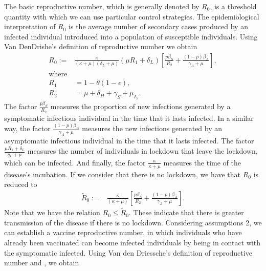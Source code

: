 
%
The basic reproductive number, which is generally denoted by $ R_0 $,
is a threshold quantity with which we can use 
particular control strategies. The epidemiological interpretation of 
$ R_0 $ is the average number of secondary cases produced by an infected
individual introduced into a population of susceptible individuals.
Using Van DenDrishe's \cite{VandenDriessche2017a} definition of reproductive number
we obtain
\begin{equation*}
    \label{eqn:reproductive_number}
    \begin{aligned}
        R_0 :=
        &
        \frac{\kappa}{(\kappa + \mu)(\delta_L + \mu)}
        \left(
            \mu R_1 + \delta_L
        \right)
        \left[
            \frac{p\beta_S}{R_2}
            +\frac{(1 - p) \beta_A}{\gamma_A+\mu}
        \right],
    \\
    \text{where} &
    \\
        R_1 &= 1 - \theta(1 - \epsilon),
    \\
        R_2 &= \mu + \delta_H + \gamma_S + \mu_{I_{S}}.
    \end{aligned}
\end{equation*}
%
The factor $\frac{p\beta_S}{R_2}$ measures the proportion of new infections
generated by a symptomatic infectious individual in the time that it lasts
infected. In a similar way, the factor $\frac{(1 - p) \beta_A}{\gamma_A+\mu}$
measures the new infections generated by an asymptomatic infectious individual
in the time that it lasts infected. The factor 
$\frac{\mu R_1 + \delta_L}{\delta_L + \mu}$ measures the number
of individuals in lockdown that leave the lockdown, which can be infected.
And finally, the factor $\frac{\kappa}{\kappa + \mu}$ measures
the time of the disease's incubation.
%
If we consider that there is no lockdown, we have that $ R_0 $ is reduced to
\begin{equation*}
    \label{eqn:reproductive_number}
    \begin{aligned}
        \tilde{R}_0 :=
        &
        \frac{\kappa}{(\kappa + \mu)}
        \left[
            \frac{p\beta_S}{R_2}
            +\frac{(1 - p) \beta_A}{\gamma_A+\mu}
        \right].
    \end{aligned}
\end{equation*}
%
Note that we have the relation $ R_0 \leq \tilde{R}_0 $. These indicate that there is greater transmission of the disease if there is no lockdown.
%
%
Considering assumptions 2, we can establish a vaccine reproductive number,
in which individuals who have already been vaccinated
can become infected individuals by being in contact with the
symptomatic infected. Using Van den Driessche’s \cite{VandenDriessche2017a}
definition of reproductive number and \cite{Alexander2004}, we obtain

